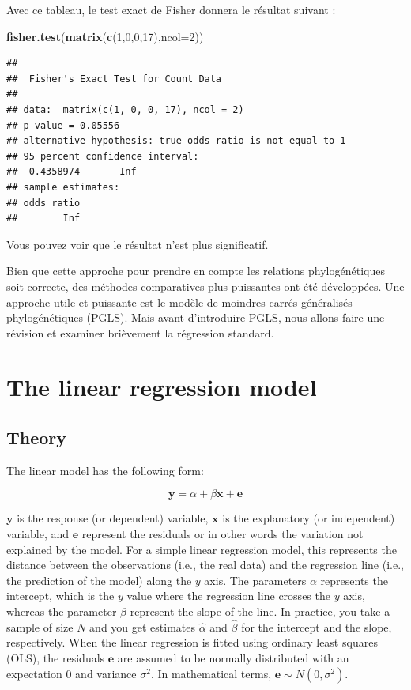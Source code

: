 \documentclass[
]{book}
\newenvironment{Shaded}{\begin{snugshade}}{\end{snugshade}}
\newcommand{\AttributeTok}[1]{\textcolor[rgb]{0.13,0.29,0.53}{#1}}
\newcommand{\DecValTok}[1]{\textcolor[rgb]{0.00,0.00,0.81}{#1}}
\newcommand{\FunctionTok}[1]{\textcolor[rgb]{0.13,0.29,0.53}{\textbf{#1}}}
\newcommand{\NormalTok}[1]{#1}
\begin{document}
Avec ce tableau, le test exact de Fisher donnera le résultat suivant :

\begin{Shaded}
\begin{Highlighting}[]
\FunctionTok{fisher.test}\NormalTok{(}\FunctionTok{matrix}\NormalTok{(}\FunctionTok{c}\NormalTok{(}\DecValTok{1}\NormalTok{,}\DecValTok{0}\NormalTok{,}\DecValTok{0}\NormalTok{,}\DecValTok{17}\NormalTok{),}\AttributeTok{ncol=}\DecValTok{2}\NormalTok{))}
\end{Highlighting}
\end{Shaded}

\begin{verbatim}
## 
##  Fisher's Exact Test for Count Data
## 
## data:  matrix(c(1, 0, 0, 17), ncol = 2)
## p-value = 0.05556
## alternative hypothesis: true odds ratio is not equal to 1
## 95 percent confidence interval:
##  0.4358974       Inf
## sample estimates:
## odds ratio 
##        Inf
\end{verbatim}

Vous pouvez voir que le résultat n'est plus significatif.

Bien que cette approche pour prendre en compte les relations phylogénétiques soit correcte, des méthodes comparatives plus puissantes ont été développées. Une approche utile et puissante est le modèle de moindres carrés généralisés phylogénétiques (PGLS). Mais avant d'introduire PGLS, nous allons faire une révision et examiner brièvement la régression standard.

\chapter{The linear regression model}\label{linear-regression}

\section{Theory}\label{theory}

The linear model has the following form:

\[\textbf{y} = \alpha + \beta \textbf{x} + \textbf{e}\]

\(\textbf{y}\) is the response (or dependent) variable, \(\textbf{x}\) is the explanatory (or independent) variable, and \(\textbf{e}\) represent the residuals or in other words the variation not explained by the model. For a simple linear regression model, this represents the distance between the observations (i.e., the real data) and the regression line (i.e., the prediction of the model) along the \(y\) axis. The parameters \(\alpha\) represents the intercept, which is the \(y\) value where the regression line crosses the \(y\) axis, whereas the parameter \(\beta\) represent the slope of the line. In practice, you take a sample of size \(N\) and you get estimates \(\hat{\alpha}\) and \(\hat{\beta}\) for the intercept and the slope, respectively. When the linear regression is fitted using ordinary least squares (OLS), the residuals \(\textbf{e}\) are assumed to be normally distributed with an expectation \(0\) and variance \(\sigma^2\). In mathematical terms, \(\textbf{e} \sim N(0,\sigma^2)\).
\end{document}
